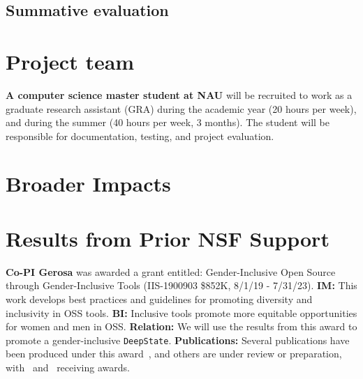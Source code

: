 \documentclass[numbers]{proposalnsf}
\newcommand{\ds}{\texttt{DeepState}}
\begin{document}
\subsection{Summative evaluation}

\section{Project team}


\textbf{A computer science master student at NAU} will be recruited to work as a graduate research assistant (GRA) during the academic year (20 hours per week), and during the summer (40 hours per week, 3 months).
The student will be responsible for documentation, testing, and project evaluation.

\section{Broader Impacts}



\section{Results from Prior NSF Support}



\textbf{Co-PI Gerosa} was awarded a grant entitled: Gender-Inclusive Open Source through Gender-Inclusive Tools (IIS-1900903 \$852K, 8/1/19 - 7/31/23). 
\textbf{IM:} This work develops best practices and guidelines for promoting diversity and inclusivity in OSS tools. 
\textbf{BI:} Inclusive tools promote more equitable opportunities for women and men in OSS. 
\textbf{Relation:} We will use the results from this award to promote a gender-inclusive  \ds.
\textbf{Publications:} Several publications have been produced under this award~\cite{balali2020recommending,dias2021makes,silva2020google,gerosa2021shifting,silva2020theory,trinkenreich2020hidden,chatterjee2021aid,mendez2019gendermag,stumpf2020gender,guizani2020gender,hilderbrand2020engineering,padala2020gender,wessel2020effects}, and others are under review or preparation, with~\cite{balali2020recommending} and~\cite{wessel2020effects} receiving awards. 


\newpage
%


\end{document}
